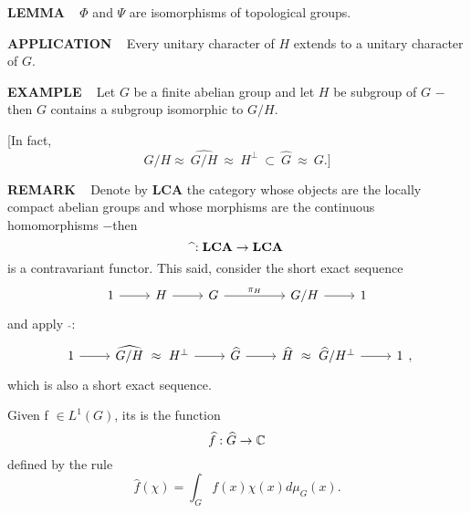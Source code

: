 \vspace{0.1cm}

\begin{x}{\small\bf LEMMA} \ %
$\Phi$ and $\Psi$ are isomorphisms of topological groups.
\end{x}

\vspace{0.1cm}

\begin{x}{\small\bf APPLICATION} \ %
Every unitary character of $H$ extends to a unitary character of $G$.
\end{x}

\vspace{0.1cm}

\begin{x}{\small\bf EXAMPLE} \ %
Let $G$ be a finite abelian group and let $H$ be subgroup of $G$ $-$then $G$ contains a subgroup isomorphic to $G/H$.

[In fact, 
\[
G/H  \approx \  \widehat{G/H}\  \approx \  H^\perp \ \subset \  \widehat{G} \ \approx \ G.]
\]
\end{x}

\vspace{0.1cm}

\begin{x}{\small\bf REMARK} \ %
Denote by $\textbf{LCA}$ the category whose objects are the locally compact abelian groups and whose morphisms are the continuous homomorphisms $-$then
\[
\widehat{ } : \mathbf{LCA} \rightarrow \mathbf{LCA}
\]
is a contravariant functor.  This said, consider the short exact sequence
\[
\begin{tikzcd}%
1 	\ar{r}	
&H	\ar{r}	
&G 	\ar{rr}{\pi_H}	
&&{G/H}	\ar{r}  
&{1}
\end{tikzcd}
\]
and apply  $ $   $\widehat{ }:$
\[
\begin{tikzcd}%
1 	\ar{r}	
&{\widehat{G/H} \  \approx \ H^\perp} 	\ar{r}	
&\widehat{G} 	\ar{r}	
&{\widehat{H} \ \approx \  \widehat{G}/H^\perp}	\ar{r}  
&{1}
\end{tikzcd}
,
\]
which is also a short exact sequence.
\end{x}

\vspace{0.1cm}

Given f $\in L^1(G)$, its 
is the function 
\[
\widehat{f} : \widehat{G} \rightarrow \mathbb{C}
\]
defined by the rule
\[
\widehat{f}(\chi) = \int_G f(x) \chi(x) d \mu_G(x).
\]

